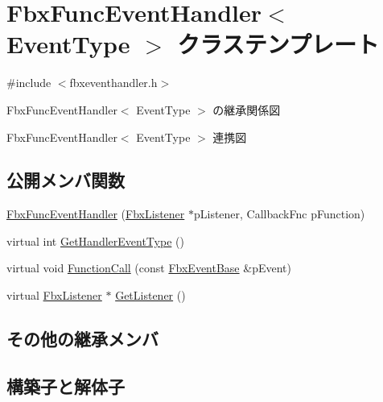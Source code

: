 \hypertarget{class_fbx_func_event_handler}{}\section{Fbx\+Func\+Event\+Handler$<$ Event\+Type $>$ クラステンプレート}
\label{class_fbx_func_event_handler}


{\ttfamily \#include $<$fbxeventhandler.\+h$>$}



Fbx\+Func\+Event\+Handler$<$ Event\+Type $>$ の継承関係図


Fbx\+Func\+Event\+Handler$<$ Event\+Type $>$ 連携図
\subsection*{公開メンバ関数}
\begin{DoxyCompactItemize}
\item 
\hyperlink{class_fbx_func_event_handler_adc9cefc0f250faf562bc0d8a83171548}{Fbx\+Func\+Event\+Handler} (\hyperlink{class_fbx_listener}{Fbx\+Listener} $\ast$p\+Listener, Callback\+Fnc p\+Function)
\item 
virtual int \hyperlink{class_fbx_func_event_handler_a0c1a0eaedda70615a684bd96aa72fb97}{Get\+Handler\+Event\+Type} ()
\item 
virtual void \hyperlink{class_fbx_func_event_handler_a6111e1a7e1a0e60170a2de498fe44766}{Function\+Call} (const \hyperlink{class_fbx_event_base}{Fbx\+Event\+Base} \&p\+Event)
\item 
virtual \hyperlink{class_fbx_listener}{Fbx\+Listener} $\ast$ \hyperlink{class_fbx_func_event_handler_af196b87b07e698704615056be5923745}{Get\+Listener} ()
\end{DoxyCompactItemize}
\subsection*{その他の継承メンバ}


\subsection{構築子と解体子}
\mbox{\label{class_fbx_func_event_handler_adc9cefc0f250faf562bc0d8a83171548}} 
